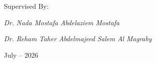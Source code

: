 \begin{titlepage}
    {\large Supervised By:}\par\vspace{0.6cm}
    {\large \textit{Dr. Nada Mostafa Abdelaziem Mostafa}}\par\vspace{0.3cm}
    {\large \textit{Dr. Reham Taher Abdelmajeed Salem Al Magraby}}\par\vfill
    
    {\footnotesize July -- 2026}
   
\end{titlepage}

\clearpage
